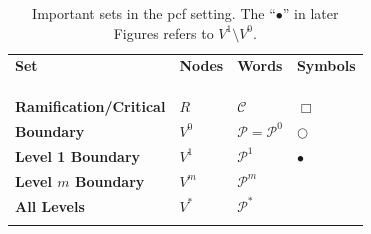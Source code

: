 \documentclass[a4paper]{amsart}
\theoremstyle{plain}
\theoremstyle{definition}
\theoremstyle{remark}
\begin{document}
\begin{table}[htbp]
\begin{tabular}{p{5cm} p{2cm} p{2cm} p{2cm}}
\hfill  \textbf{Set}  \hfill \mbox{} 
& \hfill  \textbf{Nodes}  \hfill \mbox{}
&   \hfill  \textbf{Words}  \hfill \mbox{}
&  \hfill   \textbf{Symbols}  \hfill \mbox{}       %
  
\\   \rule{0pt}{0pt} \\  \hline \\ \rule{0pt}{0pt} \\ 

 \textbf{Ramification/Critical}  
& \hfill $ R$  \hfill \mbox{}  
&  \hfill $ \mathcal{C} $ \hfill   \mbox{}
&  \hfill $ \Box $ \hfill \mbox{}%
\\

\textbf{Boundary}  
& \hfill $ V^{0}$  \hfill \mbox{}  
&  \hfill $ \mathcal{P} =\mathcal{P} ^{0}$ \hfill   \mbox{}
&  \hfill $ \bigcirc $ \hfill \mbox{}%
\\ 

\textbf{Level 1 Boundary}  
& \hfill $ V^{1}$  \hfill \mbox{}  
&  \hfill $  \mathcal{P} ^{1}$ \hfill   \mbox{}
&  \hfill $ \bullet $ \hfill \mbox{}%
 \\  
 
\textbf{Level $ m $  Boundary}  
& \hfill $ V^{m}$  \hfill \mbox{}  
&  \hfill $  \mathcal{P} ^{m}$ \hfill   \mbox{}
&  %
\\  

\textbf{All Levels}  
& \hfill $ V^{*}$  \hfill \mbox{}  
&  \hfill $  \mathcal{P} ^{*}$ \hfill   \mbox{}
&  %
 \\ \mbox{} \\
\end{tabular}
 \label{table} 
\caption{Important sets in the pcf setting. The ``$ \bullet $'' in later Figures refers to $ V^1\setminus V^0 $.}
\end{table}
\end{document}
